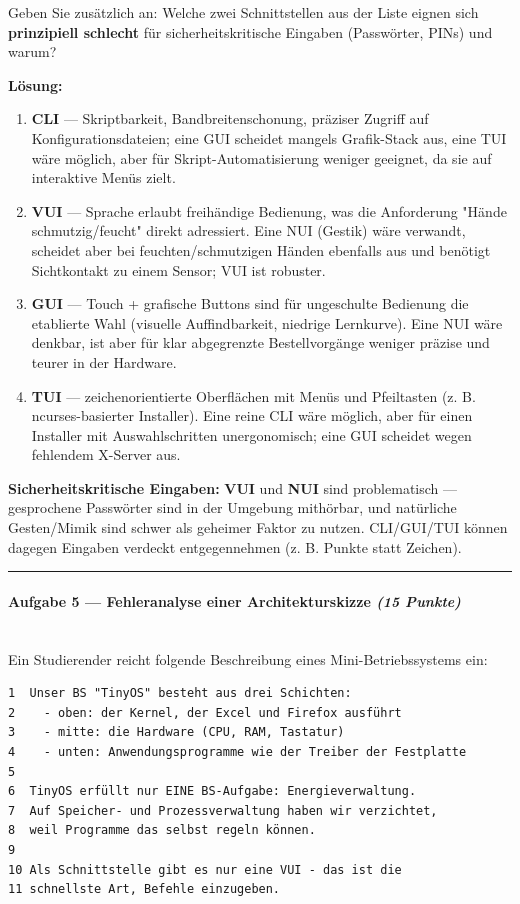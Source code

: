 \documentclass[11pt, a4paper]{article}
\begin{document}
Geben Sie zusätzlich an: Welche zwei Schnittstellen aus der Liste eignen sich \textbf{prinzipiell schlecht} für sicherheitskritische Eingaben (Passwörter, PINs) und warum?


\textbf{Lösung:}


\begin{enumerate}
  \item \textbf{CLI} — Skriptbarkeit, Bandbreitenschonung, präziser Zugriff auf Konfigurationsdateien; eine GUI scheidet mangels Grafik-Stack aus, eine TUI wäre möglich, aber für Skript-Automatisierung weniger geeignet, da sie auf interaktive Menüs zielt.
  \item \textbf{VUI} — Sprache erlaubt freihändige Bedienung, was die Anforderung "Hände schmutzig/feucht" direkt adressiert. Eine NUI (Gestik) wäre verwandt, scheidet aber bei feuchten/schmutzigen Händen ebenfalls aus und benötigt Sichtkontakt zu einem Sensor; VUI ist robuster.
  \item \textbf{GUI} — Touch + grafische Buttons sind für ungeschulte Bedienung die etablierte Wahl (visuelle Auffindbarkeit, niedrige Lernkurve). Eine NUI wäre denkbar, ist aber für klar abgegrenzte Bestellvorgänge weniger präzise und teurer in der Hardware.
  \item \textbf{TUI} — zeichenorientierte Oberflächen mit Menüs und Pfeiltasten (z. B. ncurses-basierter Installer). Eine reine CLI wäre möglich, aber für einen Installer mit Auswahlschritten unergonomisch; eine GUI scheidet wegen fehlendem X-Server aus.
\end{enumerate}

\textbf{Sicherheitskritische Eingaben:} \textbf{VUI} und \textbf{NUI} sind problematisch — gesprochene Passwörter sind in der Umgebung mithörbar, und natürliche Gesten/Mimik sind schwer als geheimer Faktor zu nutzen. CLI/GUI/TUI können dagegen Eingaben verdeckt entgegennehmen (z. B. Punkte statt Zeichen).



\noindent\textcolor{rulegray}{\rule{\linewidth}{0.4pt}}


\paragraph{Aufgabe 5 — Fehleranalyse einer Architekturskizze \textit{(15 Punkte)}}\mbox{}\\[2pt]

Ein Studierender reicht folgende Beschreibung eines Mini-Betriebssystems ein:


\begin{lstlisting}
1  Unser BS "TinyOS" besteht aus drei Schichten:
2    - oben: der Kernel, der Excel und Firefox ausführt
3    - mitte: die Hardware (CPU, RAM, Tastatur)
4    - unten: Anwendungsprogramme wie der Treiber der Festplatte
5
6  TinyOS erfüllt nur EINE BS-Aufgabe: Energieverwaltung.
7  Auf Speicher- und Prozessverwaltung haben wir verzichtet,
8  weil Programme das selbst regeln können.
9
10 Als Schnittstelle gibt es nur eine VUI - das ist die
11 schnellste Art, Befehle einzugeben.
\end{lstlisting}
\end{document}
